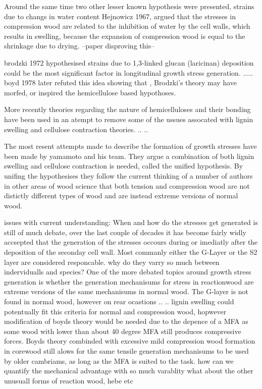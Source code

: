 \documentclass{article}
\begin{document}
Around the same time two other lesser known hypothesis were presented,  strains
due to changs in water content Hejnowicz 1967, argued that the stresses in
compression wood are related to the inhibition of water by the cell walls,
which results in swelling, because the expansion of compression wood is equal to
the shrinkage due to drying. --paper disproving this--

brodzki 1972 hypothesised strains due to 1,3-linked glucan (laricinan)
deposition could be the most significant factor in longitudinal growth stress
generation. .....
boyd 1978 later refuted this idea showing that , Brodzki's theory may have
morfed, or inspired the hemicellulose based hypothoses.

More recently theories regarding the nature of hemicelluloses and their bonding
have been used in an atempt to remove some of the ussues assocated with lignin
swelling and cellulose contraction theories. .. ..

The most resent attempts made to describe the formation of growth stresses have
been made by yamamoto and his team. They argue a combination of both lignin
swelling and cellulose contraction is needed, called the unified hypothesis.
By unifing the hypothesises they follow the current thinking of a number of
authors in other areas of wood science that both tension and compression wood
are not distictly different types of wood and are instead extreme versions of
normal wood.

issues with current understanding:
When and how do the stresses get generated is still of much debate, over the
last couple of decades it has become fairly widly accsepted that the generation
of the stresses occours during or imediatly after the deposition of the seconday
cell wall. Most commanly either the G-Layer or the S2 layer are considered
responcable.
why do they varry so much between indervidualls and species?
One of the more debated topics around growth stress generation is whether the
generation mechanisums for stress in reactionwood are extreme versions of the
same mechanisums in normal wood. The G-layer is not found in normal wood,
however on rear ocastions .. .. lignin swelling could potentually fit this
criteria for normal and compression wood, hopwever modification of boyds theory
would be needed due to the depence of a MFA as some wood with lower than about
40 degree MFA still produces compressive forces. Boyds theory combinded
with excessive mild compression wood formation in corewood still alows
for the same tensile generation mechanisums to be used by older cambriams, as
long as the MFA is suited to the task.
how can we quantify the mechanical advantage with so much varablity
what about the other unusuall forms of reaction wood, hebe etc
\end{document}
